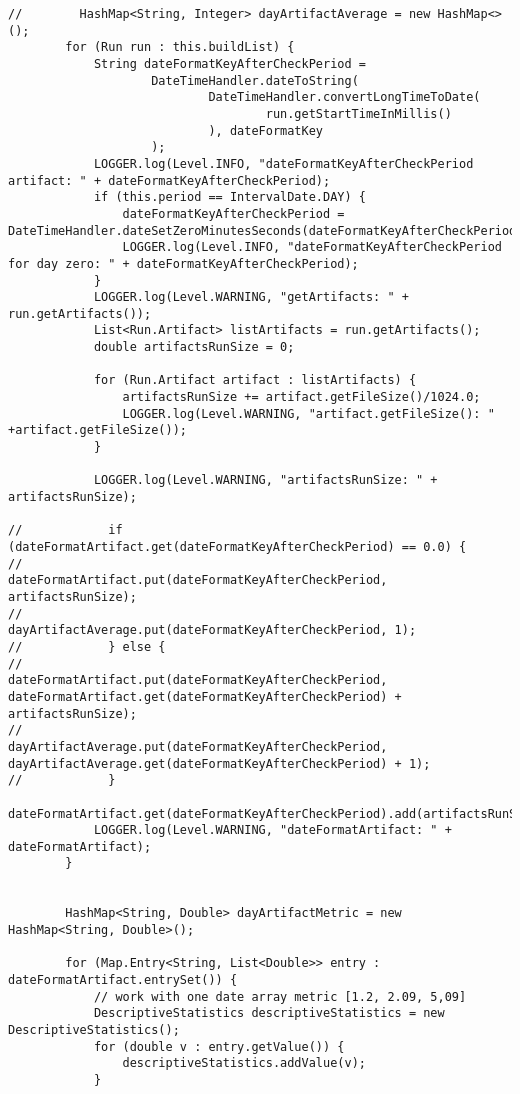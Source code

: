\begin{lstlisting}
//        HashMap<String, Integer> dayArtifactAverage = new HashMap<>();
        for (Run run : this.buildList) {
            String dateFormatKeyAfterCheckPeriod =
                    DateTimeHandler.dateToString(
                            DateTimeHandler.convertLongTimeToDate(
                                    run.getStartTimeInMillis()
                            ), dateFormatKey
                    );
            LOGGER.log(Level.INFO, "dateFormatKeyAfterCheckPeriod artifact: " + dateFormatKeyAfterCheckPeriod);
            if (this.period == IntervalDate.DAY) {
                dateFormatKeyAfterCheckPeriod = DateTimeHandler.dateSetZeroMinutesSeconds(dateFormatKeyAfterCheckPeriod);
                LOGGER.log(Level.INFO, "dateFormatKeyAfterCheckPeriod for day zero: " + dateFormatKeyAfterCheckPeriod);
            }
            LOGGER.log(Level.WARNING, "getArtifacts: " + run.getArtifacts());
            List<Run.Artifact> listArtifacts = run.getArtifacts();
            double artifactsRunSize = 0;

            for (Run.Artifact artifact : listArtifacts) {
                artifactsRunSize += artifact.getFileSize()/1024.0;
                LOGGER.log(Level.WARNING, "artifact.getFileSize(): " +artifact.getFileSize());
            }

            LOGGER.log(Level.WARNING, "artifactsRunSize: " + artifactsRunSize);

//            if (dateFormatArtifact.get(dateFormatKeyAfterCheckPeriod) == 0.0) {
//                dateFormatArtifact.put(dateFormatKeyAfterCheckPeriod, artifactsRunSize);
//                dayArtifactAverage.put(dateFormatKeyAfterCheckPeriod, 1);
//            } else {
//                dateFormatArtifact.put(dateFormatKeyAfterCheckPeriod, dateFormatArtifact.get(dateFormatKeyAfterCheckPeriod) + artifactsRunSize);
//                dayArtifactAverage.put(dateFormatKeyAfterCheckPeriod, dayArtifactAverage.get(dateFormatKeyAfterCheckPeriod) + 1);
//            }
            dateFormatArtifact.get(dateFormatKeyAfterCheckPeriod).add(artifactsRunSize);
            LOGGER.log(Level.WARNING, "dateFormatArtifact: " + dateFormatArtifact);
        }


        HashMap<String, Double> dayArtifactMetric = new HashMap<String, Double>();

        for (Map.Entry<String, List<Double>> entry : dateFormatArtifact.entrySet()) {
            // work with one date array metric [1.2, 2.09, 5,09]
            DescriptiveStatistics descriptiveStatistics = new DescriptiveStatistics();
            for (double v : entry.getValue()) {
                descriptiveStatistics.addValue(v);
            }


\end{lstlisting}
